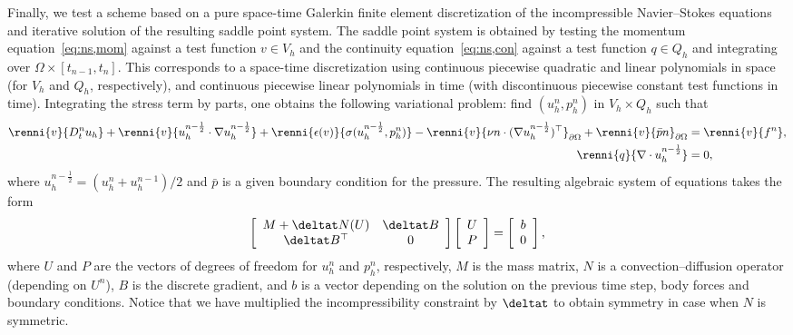 Finally, we test a scheme based on a pure space-time Galerkin finite
element discretization of the incompressible Navier--Stokes equations
and iterative solution of the resulting saddle point system. The
saddle point system is obtained by testing the momentum
equation~\eqref{eq:ns,mom} against a test function $v \in V_h$ and the
continuity equation~\eqref{eq:ns,con} against a test function $q \in
Q_h$ and integrating over $\Omega \times [t_{n-1}, t_n]$. This
corresponds to a space-time discretization using continuous piecewise
quadratic and linear polynomials in space (for $V_h$ and $Q_h$,
respectively), and continuous piecewise linear polynomials in time
(with discontinuous piecewise constant test functions in
time). Integrating the stress term by parts, one obtains the following
variational problem: find $(u^n_h, p^n_h)$ in $V_h \times Q_h$ such
that
\begin{align}
    \renni{v}{D_t^n u_h}
    + \renni{v}{u^{n-\frac{1}{2}}_h \cdot \nabla u^{n-\frac{1}{2}}_h}
    + \renni{\epsilon(v)}{\sigma(u^{n-\frac{1}{2}}_h, p^n_h)}
    - \renni{v}{\nu n \cdot (\nabla u^{n-\frac{1}{2}}_h)^{\top}}_{\partial \Omega}
    + \renni{v}{\bar{p}n}_{\partial \Omega} &= \renni{v}{f^n}, \\
    \renni{q}{\nabla \cdot u^{n-\frac{1}{2}}_h} &= 0,
\end{align}
where $u^{n-\frac{1}{2}}_h = ({u}^n_h + {u}^{n-1}_h) / 2$ and $\bar{p}$ is a
given boundary condition for the pressure. The resulting algebraic
system of equations takes the form
\begin{equation}
\left[
\begin{array}{cc}
M + \deltat N(U) & \deltat B \\
\deltat B^{\top} & 0
\end{array}
\right]
\left[
\begin{array}{c}
U \\ P
\end{array}
\right]
=
\left[
\begin{array}{c}
b\\ 0
\end{array}
\right],
\label{timestepping}
\end{equation}
where $U$ and $P$ are the vectors of degrees of freedom for $u^n_h$
and $p^n_h$, respectively, $M$ is the mass matrix, $N$ is a
convection--diffusion operator (depending on $U^n$), $B$ is the
discrete gradient, and $b$ is a vector depending on the solution on
the previous time step, body forces and boundary conditions. Notice
that we have multiplied the incompressibility constraint by $\deltat$
to obtain symmetry in case when $N$ is symmetric.


